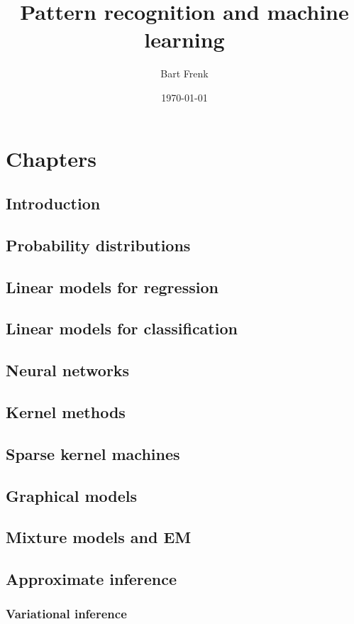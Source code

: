 \documentclass[11pt]{article}
\author{Bart Frenk}
\date{\today}
\title{Pattern recognition and machine learning}
\begin{document}
\maketitle


\section{Chapters}
\label{sec-1}
\subsection{Introduction}
\label{sec-1-1}
\subsection{Probability distributions}
\label{sec-1-2}
\subsection{Linear models for regression}
\label{sec-1-3}
\subsection{Linear models for classification}
\label{sec-1-4}
\subsection{Neural networks}
\label{sec-1-5}
\subsection{Kernel methods}
\label{sec-1-6}
\subsection{Sparse kernel machines}
\label{sec-1-7}
\subsection{Graphical models}
\label{sec-1-8}
\subsection{Mixture models and EM}
\label{sec-1-9}
\subsection{Approximate inference}
\label{sec-1-10}
\subsubsection{Variational inference}
\label{sec-1-10-1}
\end{document}
